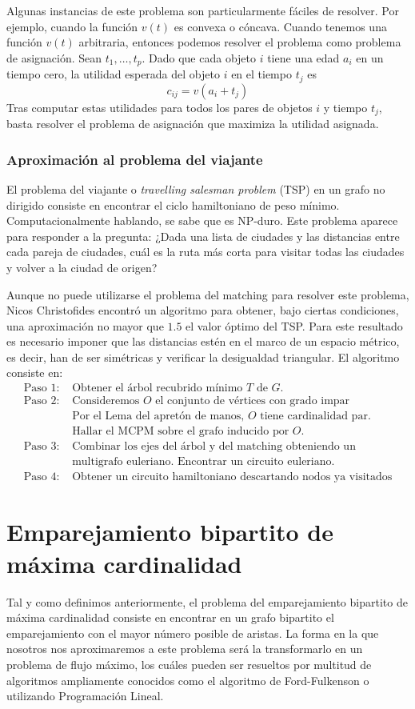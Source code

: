 \documentclass[twoside,12pt]{article}
\begin{document}
Algunas instancias de este problema son particularmente fáciles de resolver. Por ejemplo, cuando la función $v(t)$ es convexa o cóncava. Cuando tenemos una función $v(t)$ arbitraria, entonces podemos resolver el problema como problema de asignación. Sean $t_1,\dotsc, t_p$. Dado que cada objeto $i$ tiene una edad $a_i$ en un tiempo cero, la utilidad esperada del objeto $i$ en el tiempo $t_j$ es
$$
c_{ij} = v(a_i+t_j)
$$
Tras computar estas utilidades para todos los pares de objetos $i$ y tiempo $t_j$, basta resolver el problema de asignación que maximiza la utilidad asignada.
\subsubsection{Aproximación al problema del viajante}
El problema del viajante o \textit{travelling salesman problem} (TSP) en un grafo no dirigido consiste en encontrar el ciclo hamiltoniano de peso mínimo. Computacionalmente hablando, se sabe que es NP-duro. Este problema aparece para responder a la pregunta: ¿Dada una lista de ciudades y las distancias entre cada pareja de ciudades, cuál es la ruta más corta para visitar todas las ciudades y volver a la ciudad de origen? 

Aunque no puede utilizarse el problema del matching para resolver este problema, Nicos Christofides encontró un algoritmo para obtener, bajo ciertas condiciones, una aproximación no mayor que $1.5$ el valor óptimo del TSP. Para este resultado es necesario imponer que las distancias estén en el marco de un espacio métrico, es decir, han de ser simétricas y verificar la desigualdad triangular. El algoritmo consiste en:
\begin{align*}
\text{Paso 1: }&\text{Obtener el árbol recubrido mínimo $T$ de $G$.}\\
\text{Paso 2: }&\text{Consideremos $O$ el conjunto de vértices con grado impar}\\
&\text{Por el Lema del apretón de manos, $O$ tiene cardinalidad par.}\\
&\text{Hallar el MCPM sobre el grafo inducido por $O$.}\\
\text{Paso 3: }& \text{Combinar los ejes del árbol y del matching obteniendo un}\\
&\text{multigrafo euleriano. Encontrar un circuito euleriano.}\\
\text{Paso 4: }&\text{Obtener un circuito hamiltoniano descartando nodos ya visitados}
\end{align*} 
\section{Emparejamiento bipartito de máxima cardinalidad}
Tal y como definimos anteriormente, el problema del emparejamiento bipartito de máxima cardinalidad consiste en encontrar en un grafo bipartito el emparejamiento con el mayor número posible de aristas. La forma en la que nosotros nos aproximaremos a este problema será la transformarlo en un problema de flujo máximo, los cuáles pueden ser resueltos por multitud de algoritmos ampliamente conocidos como el algoritmo de Ford-Fulkenson o utilizando Programación Lineal. 
\end{document}
